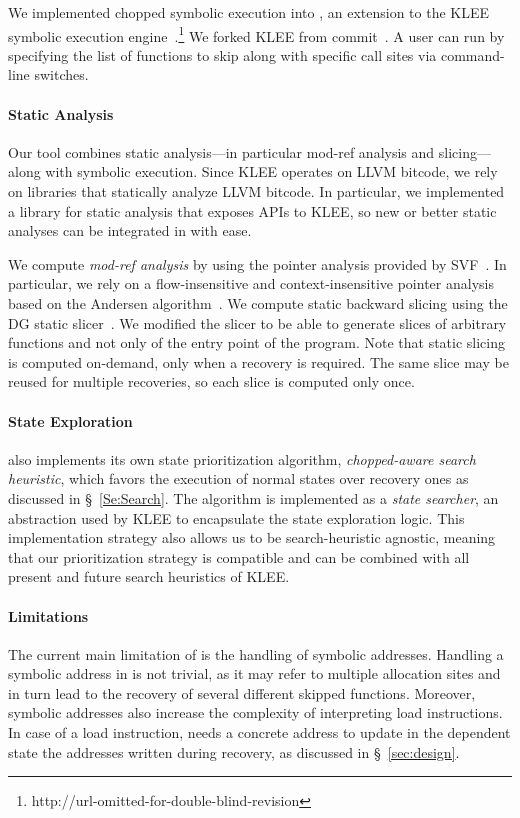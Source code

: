 
We implemented chopped symbolic execution into \toolname, an extension
to the KLEE symbolic execution
engine~\cite{klee}.\footnote{http://url-omitted-for-double-blind-revision}
We forked KLEE from commit~. A user can run \toolname by
specifying the list of functions to skip along with specific call
sites via command-line switches.

\paragraph{Static Analysis} Our tool combines static analysis---in
particular mod-ref analysis and slicing---along with symbolic
execution. Since KLEE operates on LLVM bitcode, we rely on libraries
that statically analyze LLVM bitcode. In particular, we implemented a
library for static analysis that exposes APIs to KLEE, so new or
better static analyses can be integrated in \toolname with ease.

We compute \textit{mod-ref analysis} by using the pointer analysis
provided by SVF~\cite{sui2016svf}. In particular, we rely on a
flow-insensitive and context-insensitive pointer analysis based on the
Andersen algorithm~\cite{andersen:pointeranalysis}. We compute static
backward slicing using the DG static slicer~\cite{dg}. We modified the
slicer to be able to generate slices of arbitrary functions and not
only of the entry point of the program. Note that static slicing is
computed on-demand, only when a recovery is required. The same slice
may be reused for multiple recoveries, so each slice is computed only
once.

\paragraph{State Exploration} \toolname also implements its own state
prioritization algorithm, \textit{chopped-aware search heuristic},
which favors the execution of normal states over recovery ones as
discussed in \S~\ref{Se:Search}. The algorithm is implemented as a
\textit{state searcher}, an abstraction used by KLEE to encapsulate
the state exploration logic. This implementation strategy also allows
us to be search-heuristic agnostic, meaning that our prioritization
strategy is compatible and can be combined with all present and future
search heuristics of KLEE.

\paragraph{Limitations} The current main limitation of \toolname is
the handling of symbolic addresses. Handling a symbolic address in
\toolname is not trivial, as it may refer to multiple allocation sites
and in turn lead to the recovery of several different skipped
functions. Moreover, symbolic addresses also increase the complexity
of interpreting load instructions. In case of a load instruction,
\toolname needs a concrete address to update in the dependent state
the addresses written during recovery, as discussed in
\S~\ref{sec:design}.

